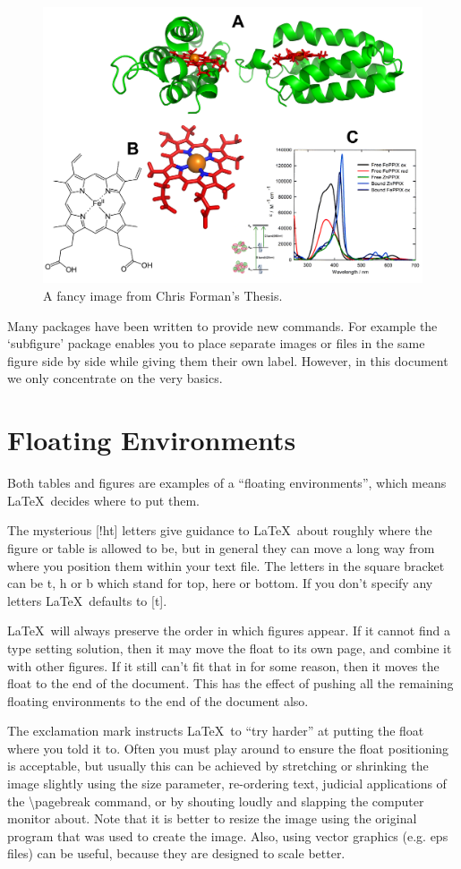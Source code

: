 \begin{figure}[!ht]
	\centering
	\includegraphics[width=137.4mm]{Images/haemStructure.png}
	\caption[Haem Structure]{A fancy image from Chris Forman's Thesis.}
	\label{fig:haemStructure}
\end{figure}

Many packages have been written to provide new commands. For example the `subfigure' package enables you to place separate images or files in the same figure side by side while giving them their own label. However, in this document we only concentrate on the very basics.

\section{Floating Environments}

Both tables and figures are examples of a ``floating environments'', which means \LaTeX\ decides where to put them.

The mysterious [!ht] letters give guidance to \LaTeX\ about roughly where the figure or table is allowed to be, but in general they can move a long way from where you position them within your text file. The letters in the square bracket can be t, h or b which stand for top, here or bottom. If you don't specify any letters \LaTeX\ defaults to [t].

\LaTeX\ will always preserve the order in which figures appear.  If it cannot find a type setting solution, then it may move the float to its own page, and combine it with other figures. If it still can't fit that in for some reason, then it moves the float to the end of the document.  This has the effect of pushing all the remaining floating environments to the end of the document also.

The exclamation mark instructs \LaTeX\ to ``try harder'' at putting the float where you told it to. Often you must play around to ensure the float positioning is acceptable, but usually this can be achieved by stretching or shrinking the image slightly using the size parameter, re-ordering text, judicial applications of the {\textbackslash}pagebreak command, or by shouting loudly and slapping the computer monitor about. Note that it is better to resize the image using the original program that was used to create the image. Also, using vector graphics (e.g. eps files) can be useful, because they are designed to scale better. 
